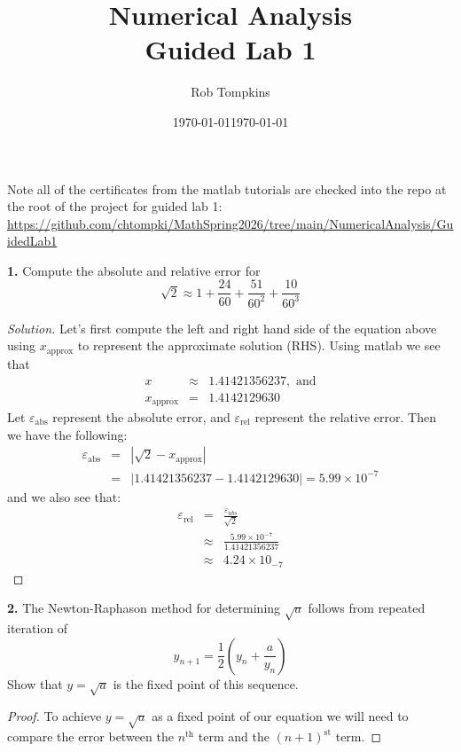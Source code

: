 \documentclass[12pt]{amsart}
\title{Numerical Analysis\\Guided Lab 1}
\author{Rob Tompkins}
\date{\today}
\newenvironment{solution}
{\begin{proof}[Solution]}
{\end{proof}}
\begin{document}
    \maketitle
    \date{\today}
    \begin{onehalfspace}
        Note all of the certificates from the matlab tutorials are checked into the repo
        at the root of the project for guided lab 1: \\
        \underline{https://github.com/chtompki/MathSpring2026/tree/main/NumericalAnalysis/GuidedLab1}

        \textbf{1.} Compute the absolute and relative error for
        \begin{displaymath}
            \sqrt{2} \approx 1 + \frac{24}{60} + \frac{51}{60^2} + \frac{10}{60^3}
        \end{displaymath}
        \begin{solution}
            Let's first compute the left and right hand side of the equation above using $x_{\text{approx}}$ to
            represent the approximate solution (RHS). Using matlab we see that
            \begin{eqnarray*}
                x & \approx & 1.41421356237, \text{ and} \\
                x_{\text{approx}} & = & 1.4142129630
            \end{eqnarray*}
            Let $\varepsilon_{\text{abs}}$ represent the absolute error, and $\varepsilon_{\text{rel}}$ represent the
            relative error. Then we have the following:
            \begin{eqnarray*}
                \varepsilon_{\text{abs}} & = & |\sqrt{2} - x_{\text{approx}} | \\
                & = & |1.41421356237 - 1.4142129630| = 5.99 \times 10^{-7}
            \end{eqnarray*}
            and we also see that:
            \begin{eqnarray*}
                \varepsilon_{\text{rel}} & = & \frac{\varepsilon_{abs}}{\sqrt{2}} \\
                & \approx & \frac{5.99\times 10^{-7}}{1.41421356237}\\
                & \approx & 4.24\times 10_{-7}
            \end{eqnarray*}
        \end{solution}

        \textbf{2.}
        The Newton-Raphason method for determining $\sqrt{a}$ follows from repeated
        iteration of
        \begin{equation}
            y_{n+1} = \frac{1}{2} \left(y_n + \frac{a}{y_n}\right)
        \end{equation}
        Show that $y = \sqrt{a}$ is the fixed point of this sequence.
        \begin{proof}
            To achieve $y = \sqrt{a}$ as a fixed point of our equation we will need to
            compare the error between the $n^{\text{th}}$ term and the $(n+1)^{\text{st}}$
            term.


\end{proof}
\end{onehalfspace}
\end{document}
